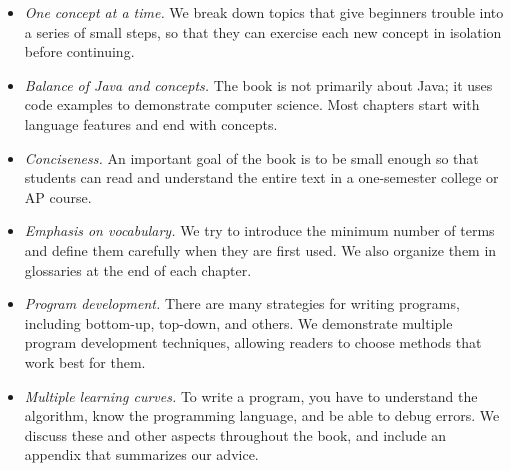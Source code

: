 \documentclass[12pt]{book}
\theoremstyle{exercise}
\newcommand{\java}{\verb}%}
\begin{document}
\begin{itemize}

\item {\em One concept at a time.}
We break down topics that give beginners trouble into a series of small steps, so that they can exercise each new concept in isolation before continuing.

\item {\em Balance of Java and concepts.}
The book is not primarily about Java; it uses code examples to demonstrate computer science.
Most chapters start with language features and end with concepts.

\item {\em Conciseness.}
An important goal of the book is to be small enough so that students can read and understand the entire text in a one-semester college or AP course.

\item {\em Emphasis on vocabulary.}
We try to introduce the minimum number of terms and define them carefully when they are first used.
We also organize them in glossaries at the end of each chapter.

\item {\em Program development.}
There are many strategies for writing programs, including bottom-up, top-down, and others.
We demonstrate multiple program development techniques, allowing readers to choose methods that work best for them.

\item {\em Multiple learning curves.}
To write a program, you have to understand the algorithm, know the programming language, and be able to debug errors.
We discuss these and other aspects throughout the book, and include an appendix that summarizes our advice.



\end{itemize}
\end{document}
